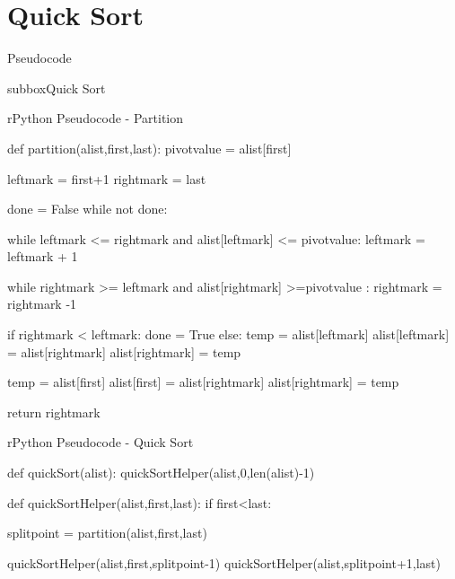 \documentclass[10pt,a4paper]{article}
\begin{document}
\section*{Quick Sort}
\begin{textbox}{Pseudocode}
\begin{subbox}{subbox}{Quick Sort}
\begin{codebox}{r}{Python Pseudocode - Partition }

def partition(alist,first,last):
   pivotvalue = alist[first]

   leftmark = first+1
   rightmark = last

   done = False
   while not done:

       while leftmark <= rightmark and alist[leftmark] <= pivotvalue:
           leftmark = leftmark + 1

       while rightmark >= leftmark and alist[rightmark] >=pivotvalue  :
           rightmark = rightmark -1

       if rightmark < leftmark:
           done = True
       else:
           temp = alist[leftmark]
           alist[leftmark] = alist[rightmark]
           alist[rightmark] = temp

   temp = alist[first]
   alist[first] = alist[rightmark]
   alist[rightmark] = temp


   return rightmark

 
\end{codebox}
\begin{codebox}{r}{Python Pseudocode - Quick Sort}

def quickSort(alist):
   quickSortHelper(alist,0,len(alist)-1)

def quickSortHelper(alist,first,last):
   if first<last:

       splitpoint = partition(alist,first,last)

       quickSortHelper(alist,first,splitpoint-1)
       quickSortHelper(alist,splitpoint+1,last)

        
\end{codebox}
\end{subbox}
\end{textbox}
\end{document}
